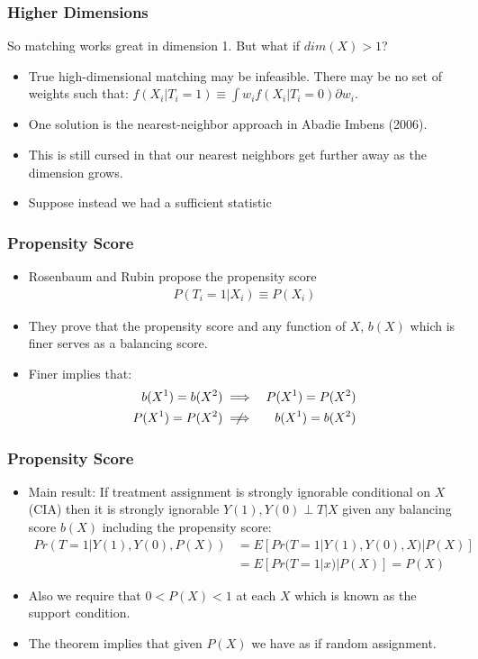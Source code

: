 \documentclass[xcolor=pdftex,dvipsnames,table,mathserif,aspectratio=169]{beamer}
\begin{document}
\begin{frame}
\frametitle{Higher Dimensions}
So matching works great in dimension 1. But what if $dim(X) > 1$?
\begin{itemize}
\item True high-dimensional matching may be infeasible. There may be no set of weights such that:
$f(X_i | T_i=1) \equiv \int w_i f(X_i | T_i=0) \partial w_i $.
\item One solution is the nearest-neighbor approach in Abadie Imbens (2006).
\item This is still cursed in that our nearest neighbors get further away as the dimension grows.
\item Suppose instead we had a \alert{sufficient statistic}
\end{itemize}
\end{frame}

\begin{frame}
\frametitle{Propensity Score}
\begin{itemize}
\item Rosenbaum and Rubin propose the \alert{propensity score}
\begin{eqnarray*}
P(T_i  = 1 | X_i) \equiv P(X_i)
\end{eqnarray*}
\item They prove that the propensity score and any function of $X$, $b(X)$ which is finer serves as a \alert{balancing score}.
\item Finer implies that:
\begin{eqnarray*}
b(X^1) = b(X^2) &\implies& P(X^1) = P(X^2)\\
P(X^1) = P(X^2) & \centernot \implies & b(X^1) = b(X^2)
\end{eqnarray*}
\end{itemize}
\end{frame}


\begin{frame}
\frametitle{Propensity Score}
\begin{itemize}
\item Main result: If treatment assignment is strongly ignorable conditional on $X$ (CIA) then it is strongly ignorable $Y(1),Y(0) \perp T | X$ given any balancing score $b(X)$ including the propensity score:
\begin{align*}
Pr(T=1 | Y(1), Y(0),P(X))&= E[Pr(T=1| Y(1),Y(0),X) | P(X)] \\
&= E[Pr(T=1 | x) | P(X) ] = P(X)
\end{align*}
\item Also we require that $0 < P(X) < 1$ at each $X$ which is known as the \alert{support condition}.
\item The theorem implies that given $P(X)$ we have as if random assignment.
\end{itemize}
\end{frame}
\end{document}
